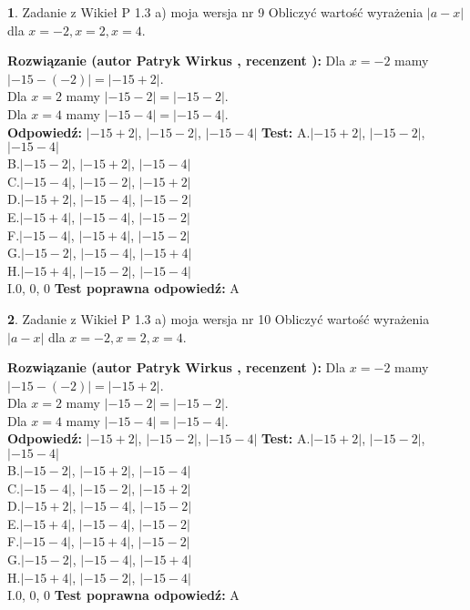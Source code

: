 \documentclass[12pt, a4paper]{article}
\theoremstyle{definition} %
\newtheorem{zad}{}
\newcommand{\zadStart}[1]{\begin{zad}#1\newline}
\newcommand{\zadStop}{\end{zad}}
\newcommand{\rozwStart}[2]{\noindent \textbf{Rozwiązanie (autor #1 , recenzent #2): }\newline}
\newcommand{\rozwStop}{\newline}
\newcommand{\odpStart}{\noindent \textbf{Odpowiedź:}\newline}
\newcommand{\odpStop}{\newline}
\newcommand{\testStart}{\noindent \textbf{Test:}\newline}
\newcommand{\testStop}{\newline}
\newcommand{\kluczStart}{\noindent \textbf{Test poprawna odpowiedź:}\newline}
\newcommand{\kluczStop}{\newline}
\begin{document}
\zadStart{Zadanie z Wikieł P 1.3 a) moja wersja nr 9}
Obliczyć wartość wyrażenia $|a - x|$ dla $x=-2,x=2,x=4$.
\zadStop
\rozwStart{Patryk Wirkus}{}
Dla $x = -2$ mamy $|-15 - (-2)| = |-15 + 2|$.\\
Dla $x = 2$ mamy $|-15 - 2| = |-15 - 2|$.\\
Dla $x = 4$ mamy $|-15 - 4| = |-15 - 4|$.\\
\rozwStop
\odpStart
$|-15 + 2|$, $|-15 - 2|$, $|-15 - 4|$
\odpStop
\testStart
A.$|-15 + 2|$, $|-15 - 2|$, $|-15 - 4|$\\
B.$|-15 - 2|$, $|-15 + 2|$, $|-15 - 4|$\\
C.$|-15 - 4|$, $|-15 - 2|$, $|-15 + 2|$\\
D.$|-15 + 2|$, $|-15 - 4|$, $|-15 - 2|$\\
E.$|-15 + 4|$, $|-15 - 4|$, $|-15 - 2|$\\
F.$|-15 - 4|$, $|-15 + 4|$, $|-15 - 2|$\\
G.$|-15 - 2|$, $|-15 - 4|$, $|-15 + 4|$\\
H.$|-15 + 4|$, $|-15 - 2|$, $|-15 - 4|$\\
I.$0$, $0$, $0$
\testStop
\kluczStart
A
\kluczStop



\zadStart{Zadanie z Wikieł P 1.3 a) moja wersja nr 10}
Obliczyć wartość wyrażenia $|a - x|$ dla $x=-2,x=2,x=4$.
\zadStop
\rozwStart{Patryk Wirkus}{}
Dla $x = -2$ mamy $|-15 - (-2)| = |-15 + 2|$.\\
Dla $x = 2$ mamy $|-15 - 2| = |-15 - 2|$.\\
Dla $x = 4$ mamy $|-15 - 4| = |-15 - 4|$.\\
\rozwStop
\odpStart
$|-15 + 2|$, $|-15 - 2|$, $|-15 - 4|$
\odpStop
\testStart
A.$|-15 + 2|$, $|-15 - 2|$, $|-15 - 4|$\\
B.$|-15 - 2|$, $|-15 + 2|$, $|-15 - 4|$\\
C.$|-15 - 4|$, $|-15 - 2|$, $|-15 + 2|$\\
D.$|-15 + 2|$, $|-15 - 4|$, $|-15 - 2|$\\
E.$|-15 + 4|$, $|-15 - 4|$, $|-15 - 2|$\\
F.$|-15 - 4|$, $|-15 + 4|$, $|-15 - 2|$\\
G.$|-15 - 2|$, $|-15 - 4|$, $|-15 + 4|$\\
H.$|-15 + 4|$, $|-15 - 2|$, $|-15 - 4|$\\
I.$0$, $0$, $0$
\testStop
\kluczStart
A
\kluczStop
\end{document}
